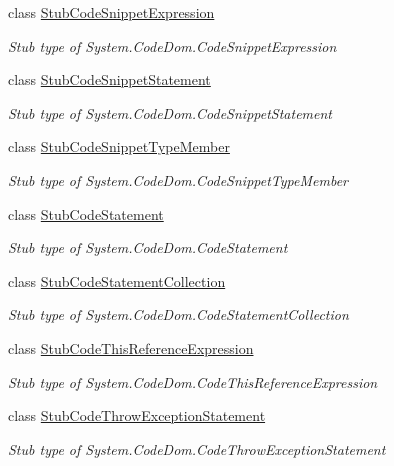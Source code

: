 \begin{DoxyCompactItemize}
class \hyperlink{class_system_1_1_code_dom_1_1_fakes_1_1_stub_code_snippet_expression}{Stub\-Code\-Snippet\-Expression}
\begin{DoxyCompactList}\small\item\em Stub type of System.\-Code\-Dom.\-Code\-Snippet\-Expression\end{DoxyCompactList}\item 
class \hyperlink{class_system_1_1_code_dom_1_1_fakes_1_1_stub_code_snippet_statement}{Stub\-Code\-Snippet\-Statement}
\begin{DoxyCompactList}\small\item\em Stub type of System.\-Code\-Dom.\-Code\-Snippet\-Statement\end{DoxyCompactList}\item 
class \hyperlink{class_system_1_1_code_dom_1_1_fakes_1_1_stub_code_snippet_type_member}{Stub\-Code\-Snippet\-Type\-Member}
\begin{DoxyCompactList}\small\item\em Stub type of System.\-Code\-Dom.\-Code\-Snippet\-Type\-Member\end{DoxyCompactList}\item 
class \hyperlink{class_system_1_1_code_dom_1_1_fakes_1_1_stub_code_statement}{Stub\-Code\-Statement}
\begin{DoxyCompactList}\small\item\em Stub type of System.\-Code\-Dom.\-Code\-Statement\end{DoxyCompactList}\item 
class \hyperlink{class_system_1_1_code_dom_1_1_fakes_1_1_stub_code_statement_collection}{Stub\-Code\-Statement\-Collection}
\begin{DoxyCompactList}\small\item\em Stub type of System.\-Code\-Dom.\-Code\-Statement\-Collection\end{DoxyCompactList}\item 
class \hyperlink{class_system_1_1_code_dom_1_1_fakes_1_1_stub_code_this_reference_expression}{Stub\-Code\-This\-Reference\-Expression}
\begin{DoxyCompactList}\small\item\em Stub type of System.\-Code\-Dom.\-Code\-This\-Reference\-Expression\end{DoxyCompactList}\item 
class \hyperlink{class_system_1_1_code_dom_1_1_fakes_1_1_stub_code_throw_exception_statement}{Stub\-Code\-Throw\-Exception\-Statement}
\begin{DoxyCompactList}\small\item\em Stub type of System.\-Code\-Dom.\-Code\-Throw\-Exception\-Statement\end{DoxyCompactList}\item 

\end{DoxyCompactItemize}

